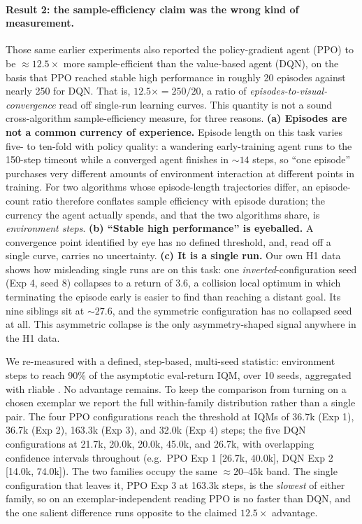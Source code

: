 \documentclass[10pt]{article}
\begin{document}
\paragraph{Result 2: the sample-efficiency claim was the wrong kind of measurement.} Those
same earlier experiments also reported the policy-gradient agent (PPO) to be
${\approx}12.5\times$ more sample-efficient than the value-based agent (DQN), on the basis
that PPO reached stable high performance in roughly 20 episodes against nearly 250 for DQN.
That is, $12.5\times = 250/20$, a ratio of \emph{episodes-to-visual-convergence} read off
single-run learning curves. This quantity is not a sound cross-algorithm sample-efficiency
measure, for three reasons. \textbf{(a) Episodes are not a common currency of experience.}
Episode length on this task varies five- to ten-fold with policy quality: a wandering
early-training agent runs to the 150-step timeout while a converged agent finishes in
${\sim}14$ steps, so ``one episode'' purchases very different amounts of environment
interaction at different points in training. For two algorithms whose episode-length
trajectories differ, an episode-count ratio therefore conflates sample efficiency with
episode duration; the currency the agent actually spends, and that the two algorithms share,
is \emph{environment steps}. \textbf{(b) ``Stable high performance'' is eyeballed.} A
convergence point identified by eye has no defined threshold, and, read off a single curve,
carries no uncertainty. \textbf{(c) It is a single run.} Our own H1 data shows how
misleading single runs are on this task: one \emph{inverted}-configuration seed (Exp 4,
seed 8) collapses to a return of 3.6, a collision local optimum in which terminating the
episode early is easier to find than reaching a distant goal. Its nine siblings sit at
${\sim}27.6$, and the symmetric configuration has no collapsed seed at all. This asymmetric
collapse is the only asymmetry-shaped signal anywhere in the H1 data.

We re-measured with a defined, step-based, multi-seed statistic: environment steps to reach
90\% of the asymptotic eval-return IQM, over 10 seeds, aggregated with rliable
\citep{agarwal2021precipice}. No advantage remains. To keep the comparison from turning on a
chosen exemplar we report the full within-family distribution rather than a single pair. The
four PPO configurations reach the threshold at IQMs of 36.7k (Exp 1), 36.7k (Exp 2), 163.3k
(Exp 3), and 32.0k (Exp 4) steps; the five DQN configurations at 21.7k, 20.0k, 20.0k, 45.0k,
and 26.7k, with overlapping confidence intervals throughout (e.g.\ PPO Exp 1 [26.7k, 40.0k],
DQN Exp 2 [14.0k, 74.0k]). The two families occupy the same ${\approx}20$--$45$k band. The
single configuration that leaves it, PPO Exp 3 at 163.3k steps, is the \emph{slowest} of
either family, so on an exemplar-independent reading PPO is no faster than DQN, and the one
salient difference runs opposite to the claimed $12.5\times$ advantage.
\end{document}
